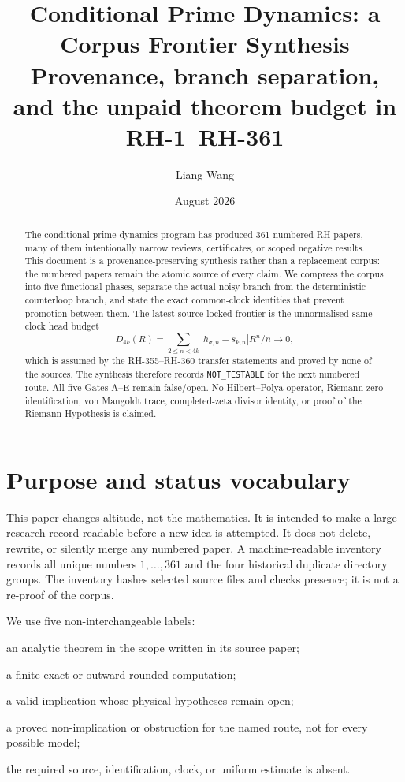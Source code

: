 \documentclass[11pt]{article}
\title{\textbf{Conditional Prime Dynamics: a Corpus Frontier Synthesis}\\
\large Provenance, branch separation, and the unpaid theorem budget in RH-1--RH-361}
\author{Liang Wang}
\date{August 2026}
\theoremstyle{definition}
\theoremstyle{remark}
\begin{document}
\maketitle

\begin{abstract}
The conditional prime-dynamics program has produced 361 numbered RH papers,
many of them intentionally narrow reviews, certificates, or scoped negative
results.  This document is a provenance-preserving synthesis rather than a
replacement corpus: the numbered papers remain the atomic source of every
claim.  We compress the corpus into five functional phases, separate the
actual noisy branch from the deterministic counterloop branch, and state the
exact common-clock identities that prevent promotion between them.  The
latest source-locked frontier is the unnormalised same-clock head budget
\[
 D_{4k}(R)=\sum_{2\le n<4k}|h_{\sigma,n}-s_{k,n}|R^n/n\longrightarrow0,
\]
which is assumed by the RH-355--RH-360 transfer statements and proved by
none of the sources.  The synthesis therefore records
\texttt{NOT\_TESTABLE} for the
next numbered route.  All five Gates A--E remain false/open.  No
Hilbert--Polya operator, Riemann-zero identification, von Mangoldt trace,
completed-zeta divisor identity, or proof of the Riemann Hypothesis is
claimed.
\end{abstract}

\section{Purpose and status vocabulary}

This paper changes altitude, not the mathematics.  It is intended to make a
large research record readable before a new idea is attempted.  It does not
delete, rewrite, or silently merge any numbered paper.  A machine-readable
inventory records all unique numbers $1,\ldots,361$ and the four historical
duplicate directory groups.  The inventory hashes selected source files and
checks presence; it is not a re-proof of the corpus.

We use five non-interchangeable labels:
\begin{description}[leftmargin=2.8cm,style=nextline]
\item[proved] an analytic theorem in the scope written in its source paper;
\item[certified] a finite exact or outward-rounded computation;
\item[conditional] a valid implication whose physical hypotheses remain open;
\item[scoped negative] a proved non-implication or obstruction for the named
 route, not for every possible model;
\item[open/NOT\_TESTABLE] the required source, identification, clock, or
 uniform estimate is absent.
\end{description}
\end{document}
